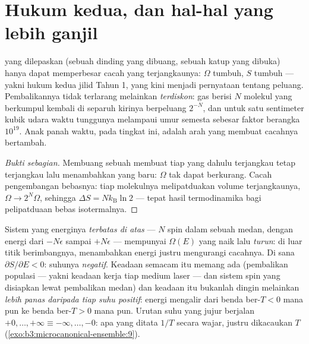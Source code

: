 \section{Hukum kedua, dan hal-hal yang lebih ganjil}

\begin{proposition}\label{prop:b3:microcanonical-ensemble:second-law}
 yang dilepaskan (sebuah dinding yang dibuang, sebuah katup yang
dibuka) hanya dapat memperbesar cacah yang terjangkaunya: $\Omega$
tumbuh, $S$ tumbuh --- yakni hukum kedua jilid Tahun 1, yang kini menjadi
pernyataan tentang peluang. Pembalikannya tidak terlarang melainkan
\emph{terdiskon}: gas berisi $N$ molekul yang berkumpul kembali di
separuh kirinya berpeluang $2^{-N}$, dan untuk satu sentimeter kubik
udara waktu tunggunya melampaui umur semesta sebesar faktor berangka
$10^{19}$. Anak panah waktu, pada tingkat ini, adalah arah yang membuat
cacahnya bertambah.
\end{proposition}

\begin{proof}[Bukti sebagian]
Membuang sebuah  membuat tiap  yang dahulu terjangkau
tetap terjangkau lalu menambahkan yang baru: $\Omega$ tak dapat
berkurang. Cacah pengembangan bebasnya: tiap molekulnya melipatduakan
volume terjangkaunya, $\Omega \to 2^N\Omega$, sehingga $\Delta S = Nk_{\text{B}}\ln2$
--- tepat hasil termodinamika bagi pelipatduaan bebas isotermalnya.
\end{proof}

\begin{example}\label{ex:b3:microcanonical-ensemble:negative}
Sistem yang energinya \emph{terbatas di atas} --- $N$ spin dalam sebuah
medan, dengan energi dari $-N\epsilon$ sampai $+N\epsilon$ --- mempunyai
$\Omega(E)$ yang naik lalu \emph{turun}: di luar titik berimbangnya,
menambahkan energi justru mengurangi cacahnya. Di sana
$\partial S/\partial E < 0$: suhunya \emph{negatif}. Keadaan semacam itu
memang ada (pembalikan populasi --- yakni keadaan kerja tiap medium
laser --- dan sistem spin yang disiapkan lewat pembalikan medan) dan
keadaan itu bukanlah dingin melainkan \emph{lebih panas daripada tiap
suhu positif}: energi mengalir dari benda ber-$T < 0$ mana pun ke benda
ber-$T > 0$ mana pun. Urutan suhu yang jujur berjalan
$+0, \dots, +\infty \equiv -\infty, \dots, -0$: apa yang ditata $1/T$
secara wajar, justru dikacaukan $T$
(\cref{exo:b3:microcanonical-ensemble:9}).
\end{example}

